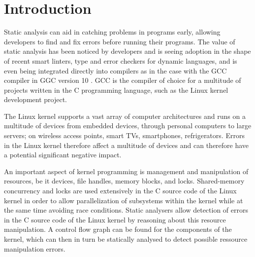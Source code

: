 \section{Introduction}

\newpar Static analysis can aid in catching problems in programs early, allowing developers to find and fix errors before running their programs. The value of static analysis has been noticed by developers and is seeing adoption in the shape of recent smart linters, type and error checkers for dynamic languages, and is even being integrated directly into compilers as in the case with the GCC compiler in GGC version 10 \cite{gcc10}. GCC is the compiler of choice for a multitude of projects written in the C programming language, such as the Linux kernel development project. 

\newpar The Linux kernel supports a vast array of computer architectures and runs on a multitude of devices from embedded devices, through personal computers to large servers; on wireless
access points, smart TVs, smartphones, refrigerators.
Errors in the Linux kernel therefore affect a multitude of devices and can therefore have a potential significant negative impact.

\newpar An important aspect of kernel programming is management and manipulation of resources, be it devices, file handles, memory blocks, and locks. Shared-memory concurrency and locks are used extensively in the C source code of the Linux kernel in order to allow parallelization of subsystems within the kernel while at the same time avoiding race conditions. Static analysers allow detection of errors in the C source code of the Linux kernel by reasoning about this resource manipulation. A control flow graph can be found for the components of the kernel, which can then in turn be statically analysed to detect possible ressource manipulation errors.
